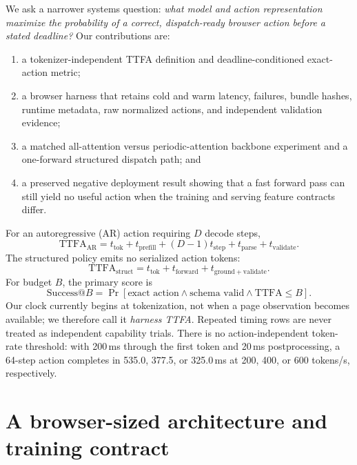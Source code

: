 \documentclass{article}
\begin{document}
We ask a narrower systems question: \emph{what model and action representation maximize the
probability of a correct, dispatch-ready browser action before a stated deadline?}  Our
contributions are:
\begin{enumerate}
  \item a tokenizer-independent TTFA definition and deadline-conditioned exact-action metric;
  \item a browser harness that retains cold and warm latency, failures, bundle hashes, runtime
        metadata, raw normalized actions, and independent validation evidence;
  \item a matched all-attention versus periodic-attention backbone experiment and a one-forward
        structured dispatch path; and
  \item a preserved negative deployment result showing that a fast forward pass can still yield
        no useful action when the training and serving feature contracts differ.
\end{enumerate}

For an autoregressive (AR) action requiring \(D\) decode steps,
\begin{equation}
  \mathrm{TTFA}_{\mathrm{AR}} =
  t_{\mathrm{tok}} + t_{\mathrm{prefill}} + (D-1)t_{\mathrm{step}}
  + t_{\mathrm{parse}} + t_{\mathrm{validate}} .
\end{equation}
The structured policy emits no serialized action tokens:
\begin{equation}
  \mathrm{TTFA}_{\mathrm{struct}} =
  t_{\mathrm{tok}} + t_{\mathrm{forward}} + t_{\mathrm{ground+validate}} .
\end{equation}
For budget \(B\), the primary score is
\[
  \mathrm{Success@}B =
  \Pr[\text{exact action} \land \text{schema valid} \land \mathrm{TTFA}\le B].
\]
Our clock currently begins at tokenization, not when a page observation becomes available; we
therefore call it \emph{harness TTFA}.  Repeated timing rows are never treated as independent
capability trials.  There is no action-independent token-rate threshold: with 200\,ms through the
first token and 20\,ms postprocessing, a 64-step action completes in 535.0, 377.5, or 325.0\,ms
at 200, 400, or 600 tokens/s, respectively.

\section{A browser-sized architecture and training contract}
\end{document}

